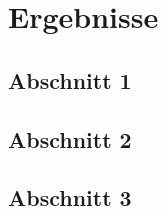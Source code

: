 
\chapter{Ergebnisse}\label{chapter: Ergebnisse}

	\section{Abschnitt 1}
	
	\section{Abschnitt 2}
	
	\section{Abschnitt 3}